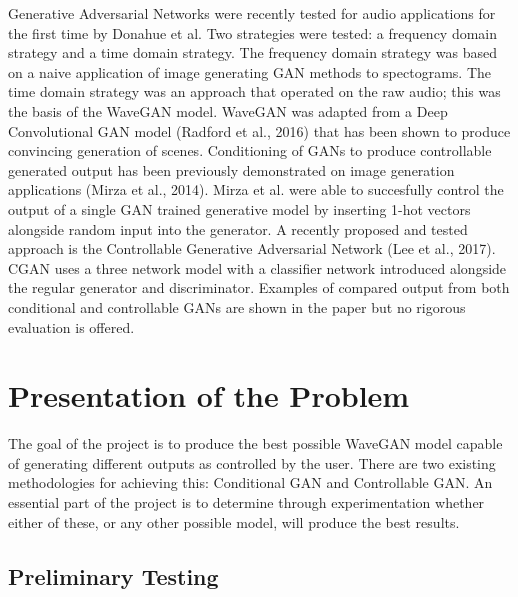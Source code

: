 \documentclass{article}
\begin{document}
Generative Adversarial Networks were recently tested for audio applications for the first time by Donahue et al.
Two strategies were tested: a frequency domain strategy and a time domain strategy.
The frequency domain strategy was based on a naive application of image generating GAN methods to spectograms.
The time domain strategy was an approach that operated on the raw audio; this was the basis of the WaveGAN model.
\newline
\newline
WaveGAN was adapted from a Deep Convolutional GAN model (Radford et al., 2016) that has been shown to produce convincing generation of scenes.
\newline
\newline
Conditioning of GANs to produce controllable generated output has been previously demonstrated on image generation applications (Mirza et al., 2014).
Mirza et al. were able to succesfully control the output of a single GAN trained generative model by inserting 1-hot vectors alongside random input into the generator.
\newline
\newline
A recently proposed and tested approach is the Controllable Generative Adversarial Network (Lee et al., 2017).
CGAN uses a three network model with a classifier network introduced alongside the regular generator and discriminator.
Examples of compared output from both conditional and controllable GANs are shown in the paper but no rigorous evaluation is offered.

\section{Presentation of the Problem}

The goal of the project is to produce the best possible WaveGAN model capable of generating different outputs as controlled by the user.
There are two existing methodologies for achieving this: Conditional GAN and Controllable GAN.
An essential part of the project is to determine through experimentation whether either of these, or any other possible model, will produce the best results.

\subsection{Preliminary Testing}
\end{document}
